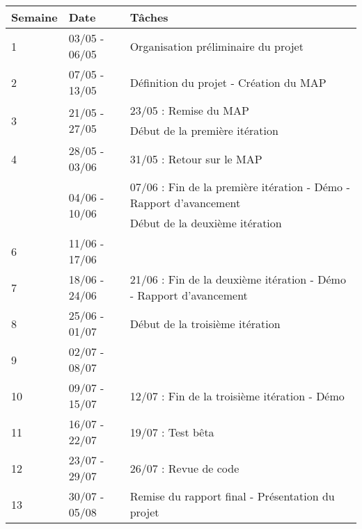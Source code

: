 \renewcommand{\arraystretch}{2}
\begin{tabular}{lll}
\hline
\bf Semaine & \bf Date & \bf Tâches \\
\hline
\hline
1 &
03/05 - 06/05 &
Organisation préliminaire du projet \\
%
2 &
07/05 - 13/05 &
Définition du projet - Création du MAP \\
%
\multirow{2}{*}{3} &
\multirow{2}{*}{21/05 - 27/05} &
23/05 : Remise du MAP \\
\rowcolor{green}
&& Début de la première itération \\
%
\rowcolor{green}
4 &
28/05 - 03/06 &
31/05 : Retour sur le MAP \\
%
\rowcolor{green}
\multirow{2}{*}{5} &
\multirow{2}{*}{04/06 - 10/06} &
07/06 : Fin de la première itération - Démo - Rapport d’avancement \\
&& \cellcolor{green!75!black} Début de la deuxième itération \\
%
\rowcolor{green!75!black}
6 &
11/06 - 17/06 & \\
%
\rowcolor{green!75!black}
7 &
18/06 - 24/06 &
21/06 : Fin de la deuxième itération - Démo - Rapport d’avancement \\
%
\rowcolor{green!50!black}
8 &
25/06 - 01/07 &
Début de la troisième itération \\
%
\rowcolor{green!50!black}
9 &
02/07 - 08/07 & \\
%
\rowcolor{green!50!black}
10 &
09/07 - 15/07 &
12/07 : Fin de la troisième itération - Démo \\
%
11 &
16/07 - 22/07 &
19/07 : Test bêta \\
%
12 &
23/07 - 29/07 &
26/07 : Revue de code \\
%
13 &
30/07 - 05/08 &
Remise du rapport final - Présentation du projet \\
%
\hline
\end{tabular}